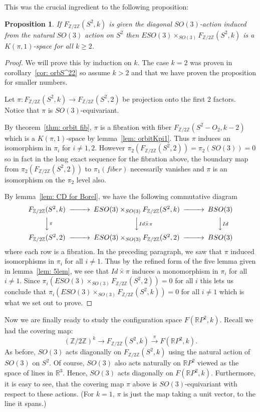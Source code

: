 \documentclass{amsart}
\newtheorem{prop}[thm]{Proposition}
\newcommand{\RR}{\mathbb{R}}
\newcommand{\Ztwo}{\mathbb{Z}/2\mathbb{Z}}
\begin{document}
This was the crucial ingredient to the following proposition:

\begin{prop}
\label{pro: orbitS2Kpi1}
If $F_{\Ztwo}(S^2,k)$ is given the diagonal $SO(3)$-action induced
from the natural $SO(3)$ action on $S^2$ then
$ESO(3) \times_{SO(3)} F_{\Ztwo}(S^2,k)$ is a $K(\pi,1)$-space
for all $k \geq 2$.
\end{prop}
\begin{proof}
We will prove this by induction on $k$. The case $k=2$ was
proven in corollary~\ref{cor: orbS^22} so assume $k>2$ and
that we have proven the proposition for smaller numbers.

Let $\pi: F_{\Ztwo}(S^2,k) \rightarrow F_{\Ztwo}(S^2,2)$
be projection onto the first $2$ factors. Notice that $\pi$
is $SO(3)$-equivariant. 

By 
theorem~\ref{thm: orbit fib}, $\pi$ is a fibration with fiber
$F_{\Ztwo}(S^2-O_2,k-2)$ which is a $K(\pi,1)$-space by 
lemma~\ref{lem: orbitKpi1}.
Thus $\pi$ induces an isomorphism in $\pi_i$ for $i \neq 1,2$. 
However $\pi_2(F_{\Ztwo}(S^2,2))=\pi_2(SO(3))=0$ so in fact
in the long exact sequence for the fibration above, the boundary
map from $\pi_2(F_{\Ztwo}(S^2,2))$ to $\pi_1(fiber)$ necessarily
vanishes and $\pi$ is an isomorphism on the $\pi_2$ level also.

By lemma~\ref{lem: CD for Borel}, we have the following commutative
diagram
$$
\begin{CD}
F_{\Ztwo}(S^2,k) @>>> ESO(3) \times_{SO(3)} F_{\Ztwo}(S^2,k) @>>>
BSO(3) \\
@VV \pi V @VV Id \bar{\times} \pi V @VV Id V \\
F_{\Ztwo}(S^2,2) @>>> ESO(3) \times_{SO(3)} F_{\Ztwo}(S^2,2) @>>>
BSO(3)
\end{CD}
$$
where each row is a fibration.
In the preceding paragraph, we saw that $\pi$ induced isomorphisms
in $\pi_i$ for all $i \neq 1$. Thus by the refined form of the
five lemma given in lemma~\ref{lem: 5lem}, we see
that $Id \bar{\times} \pi$ induces a monomorphism in $\pi_i$ for
all $i \neq 1$. Since $\pi_i(ESO(3) \times_{SO(3)} F_{\Ztwo}(S^2,2))=0$
for all $i$ this lets us conclude that
$\pi_i(ESO(3) \times_{SO(3)} F_{\Ztwo}(S^2,k))=0$ for all $i \neq 1$
which is what we set out to prove.
\end{proof}

Now we are finally ready to study the configuration space
$F(\RR P^2,k)$. Recall we had the covering map:
$$
(\Ztwo)^k \rightarrow F_{\Ztwo}(S^2,k) \overset{\pi}{\rightarrow} F(\RR P^2,k).
$$
As before, $SO(3)$ acts diagonally on $F_{\Ztwo}(S^2,k)$ using the
natural action of $SO(3)$ on $S^2$. Of course, $SO(3)$ also acts
naturally on $\RR P^2$ viewed as the space of lines in $\RR^3$.
Hence, $SO(3)$ acts diagonally on $F(\RR P^2,k)$.
Furthermore, it is easy to see, that the covering map $\pi$ above
is $SO(3)$-equivariant with respect to these actions. (For $k=1$, $\pi$
is just the map taking a unit vector, to the line it spans.) 
\end{document}
